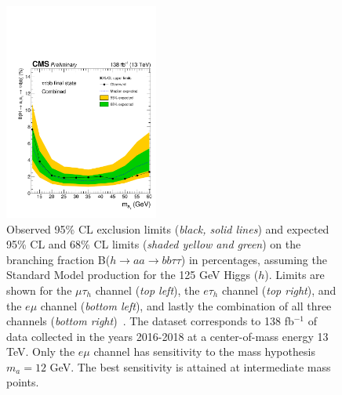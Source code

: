 \begin{figure}[h!]
\begin{center}
        \includegraphics[width=0.45\textwidth]{figures/ch-10-results/Limit_all_prelim.pdf}
    \end{center}
    \caption[Observed 95\% CL exclusion limits (\textit{black, solid lines}) and expected 95\% CL and 68\% CL limits (\textit{shaded yellow and green}) on the branching fraction B($h\rightarrow aa\rightarrow bb\tau\tau$) in percentages, assuming the Standard Model production for the 125 GeV Higgs ($h$). Limits are shown for the $\mu\tau_{h}$ channel (\textit{top left}), the $e\tau_{h}$ channel (\textit{top right}), and the $e\mu$ channel (\textit{bottom left}), and lastly the combination of all three channels (\textit{bottom right}) The dataset corresponds to 138 fb$^{-1}$ of data collected in the years 2016-2018 at a center-of-mass energy 13 TeV.]{Observed 95\% CL exclusion limits (\textit{black, solid lines}) and expected 95\% CL and 68\% CL limits (\textit{shaded yellow and green}) on the branching fraction B($h\rightarrow aa\rightarrow bb\tau\tau$) in percentages, assuming the Standard Model production for the 125 GeV Higgs ($h$). Limits are shown for the $\mu\tau_{h}$ channel (\textit{top left}), the $e\tau_{h}$ channel (\textit{top right}), and the $e\mu$ channel (\textit{bottom left}), and lastly the combination of all three channels (\textit{bottom right})~\cite{CMS-AN-20-213}. The dataset corresponds to 138 fb$^{-1}$ of data collected in the years 2016-2018 at a center-of-mass energy 13 TeV. Only the $e\mu$ channel has sensitivity to the mass hypothesis $m_a = 12$ GeV. The best sensitivity is attained at intermediate mass points.}
    \label{fig:results_limits}
\end{figure}

